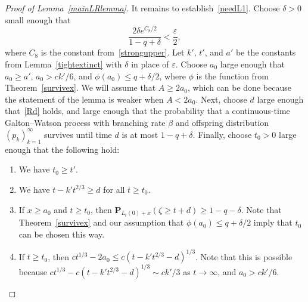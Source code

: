 \documentclass[10pt]{amsart}
\theoremstyle{definition}\newtheorem{defi}[theo]{Definition}\newtheorem{rema}[theo]{Remark}\newtheorem{exam}[theo]{Example}\newtheorem{exem}[theo]{Example}\newtheorem{nota}[theo]{Notation}
\newcommand*\eps{\varepsilon}
\renewcommand*\P{\mathbf{P}}
\newcommand{\1} {\mathds{1}}
\begin{document}
\begin{proof}[Proof of Lemma~\ref{mainLRlemma}]
It remains to establish~\eqref{needL1}. Choose $\delta > 0$ small enough that
\begin{equation}\label{deltadef}
\frac{2 \delta e^{C_8/2}}{1 - q + \delta} < \frac{\eps}{2},
\end{equation}
where $C_8$ is the constant from~\eqref{strongupper}. Let $k'$, $t'$, and $a'$ be the constants from Lemma~\ref{tightextinct} with $\delta$ in place of $\eps$. Choose $a_0$ large enough that $a_0 \geq a'$, $a_0 > ck'/6$, and $\phi(a_0) \leq q + \delta/2$, where $\phi$ is the function from Theorem~\ref{survivex}. We will assume that $A \geq 2a_0$, which can be done because the statement of the lemma is weaker when $A < 2a_0$. Next, choose $d$ large enough that~\eqref{Rd} holds, and large enough that the probability that a continuous-time Galton--Watson process with branching rate $\beta$ and offspring distribution $(p_k)_{k=1}^{\infty}$ survives until time $d$ is at most $1 - q + \delta$. Finally, choose $t_0 > 0$ large enough that the following hold:
\begin{enumerate}
\item We have $t_0 \geq t'$.

\item We have $t - k't^{2/3} \geq d$ for all $t \geq t_0$.

\item If $x \geq a_0$ and $t \geq t_0$, then $\P_{L_t(0) + x}(\zeta \geq t + d) \geq 1 - q - \delta$. Note that Theorem~\ref{survivex} and our assumption that $\phi(a_0) \leq q + \delta/2$ imply that $t_0$ can be chosen this way.

\item If $t \geq t_0$, then $ct^{1/3} - 2a_0 \leq c(t - k' t^{2/3} - d)^{1/3}$. Note that this is possible because $ct^{1/3} - c(t - k't^{2/3} - d)^{1/3} \sim ck'/3$ as $t \rightarrow \infty$, and $a_0 > ck'/6$.
\end{enumerate}


\end{proof}
\end{document}
